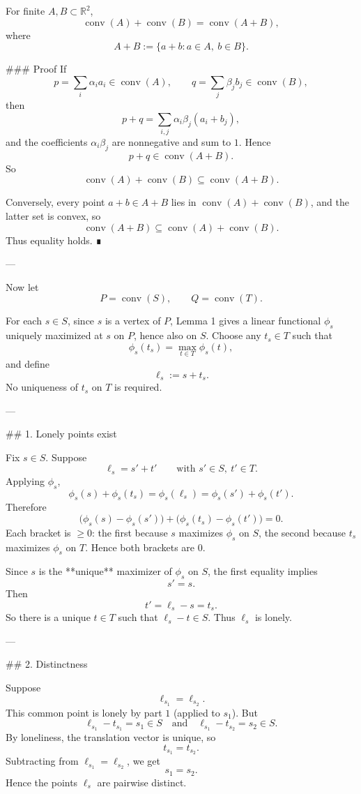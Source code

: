 For finite \(A,B\subset\mathbb R^2\),
\[
\operatorname{conv}(A)+\operatorname{conv}(B)=\operatorname{conv}(A+B),
\]
where
\[
A+B:=\{a+b:a\in A,\ b\in B\}.
\]

### Proof
If
\[
p=\sum_i \alpha_i a_i\in \operatorname{conv}(A),\qquad
q=\sum_j \beta_j b_j\in \operatorname{conv}(B),
\]
then
\[
p+q=\sum_{i,j}\alpha_i\beta_j(a_i+b_j),
\]
and the coefficients \(\alpha_i\beta_j\) are nonnegative and sum to \(1\). Hence
\[
p+q\in \operatorname{conv}(A+B).
\]
So
\[
\operatorname{conv}(A)+\operatorname{conv}(B)\subseteq \operatorname{conv}(A+B).
\]

Conversely, every point \(a+b\in A+B\) lies in
\(\operatorname{conv}(A)+\operatorname{conv}(B)\), and the latter set is convex, so
\[
\operatorname{conv}(A+B)\subseteq \operatorname{conv}(A)+\operatorname{conv}(B).
\]
Thus equality holds. ∎

---

Now let
\[
P=\operatorname{conv}(S),\qquad Q=\operatorname{conv}(T).
\]

For each \(s\in S\), since \(s\) is a vertex of \(P\), Lemma 1 gives a linear functional \(\phi_s\) uniquely maximized at \(s\) on \(P\), hence also on \(S\). Choose any \(t_s\in T\) such that
\[
\phi_s(t_s)=\max_{t\in T}\phi_s(t),
\]
and define
\[
\ell_s:=s+t_s.
\]
No uniqueness of \(t_s\) on \(T\) is required.

---

## 1. Lonely points exist

Fix \(s\in S\). Suppose
\[
\ell_s=s'+t'
\qquad\text{with }s'\in S,\ t'\in T.
\]
Applying \(\phi_s\),
\[
\phi_s(s)+\phi_s(t_s)=\phi_s(\ell_s)=\phi_s(s')+\phi_s(t').
\]
Therefore
\[
\bigl(\phi_s(s)-\phi_s(s')\bigr)+\bigl(\phi_s(t_s)-\phi_s(t')\bigr)=0.
\]
Each bracket is \(\ge 0\): the first because \(s\) maximizes \(\phi_s\) on \(S\), the second because \(t_s\) maximizes \(\phi_s\) on \(T\). Hence both brackets are \(0\).

Since \(s\) is the **unique** maximizer of \(\phi_s\) on \(S\), the first equality implies
\[
s'=s.
\]
Then
\[
t'=\ell_s-s=t_s.
\]
So there is a unique \(t\in T\) such that \(\ell_s-t\in S\). Thus \(\ell_s\) is lonely.

---

## 2. Distinctness

Suppose
\[
\ell_{s_1}=\ell_{s_2}.
\]
This common point is lonely by part \(1\) (applied to \(s_1\)). But
\[
\ell_{s_1}-t_{s_1}=s_1\in S
\quad\text{and}\quad
\ell_{s_1}-t_{s_2}=s_2\in S.
\]
By loneliness, the translation vector is unique, so
\[
t_{s_1}=t_{s_2}.
\]
Subtracting from \(\ell_{s_1}=\ell_{s_2}\), we get
\[
s_1=s_2.
\]
Hence the points \(\ell_s\) are pairwise distinct.

